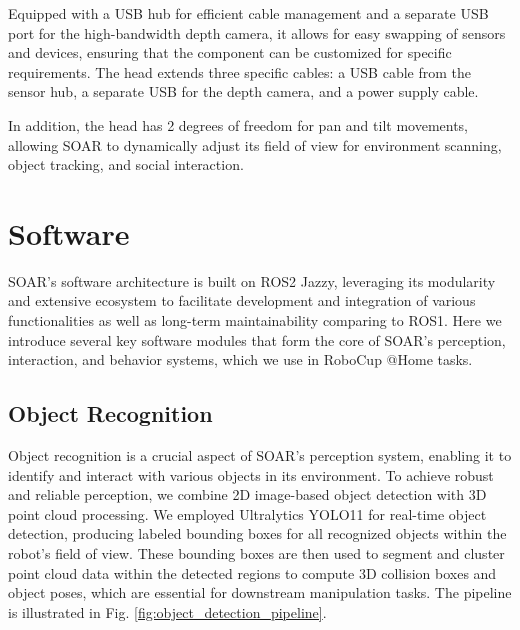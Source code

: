 \documentclass[runningheads,a4paper]{llncs}
\begin{document}
Equipped with a USB hub for efficient cable management and a separate USB port for the high-bandwidth depth camera, it allows for easy swapping of sensors and devices, ensuring that the component can be customized for specific requirements.
The head extends three specific cables: a USB cable from the sensor hub, a separate USB for the depth camera, and a power supply cable.

In addition, the head has 2 degrees of freedom for pan and tilt movements, allowing SOAR to dynamically adjust its field of view for environment scanning, object tracking, and social interaction.

\section{Software}
SOAR's software architecture is built on ROS2 Jazzy, leveraging its modularity and extensive ecosystem to facilitate development and integration of various functionalities as well as long-term maintainability comparing to ROS1.
Here we introduce several key software modules that form the core of SOAR's perception, interaction, and behavior systems, which we use in RoboCup @Home tasks.

\subsection{Object Recognition}
Object recognition is a crucial aspect of SOAR’s perception system, enabling it to identify and interact with various objects in its environment.
To achieve robust and reliable perception, we combine 2D image-based object detection with 3D point cloud processing.
We employed Ultralytics YOLO11\cite{yolo11_ultralytics} for real-time object detection, producing labeled bounding boxes for all recognized objects within the robot’s field of view.
These bounding boxes are then used to segment and cluster point cloud data within the detected regions to compute 3D collision boxes and object poses, which are essential for downstream manipulation tasks.
The pipeline is illustrated in Fig. \ref{fig:object_detection_pipeline}.
\end{document}
